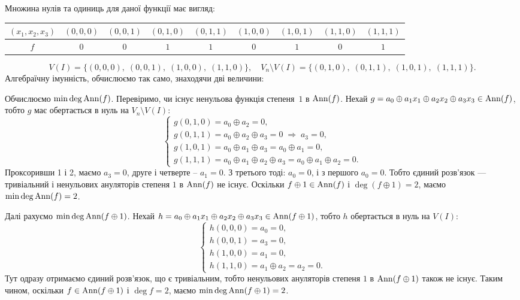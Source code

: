 \noindent Множина нулів та одиниць для даної функції має вигляд:
\begin{center}
    \begin{tabular}{c|cccccccc}
        $(x_1, x_2, x_3)$ & $(0,0,0)$ & $(0,0,1)$ & $(0,1,0)$ & $(0,1,1)$
                          & $(1,0,0)$ & $(1,0,1)$ & $(1,1,0)$ & $(1,1,1)$                         \\
        \hline
        $f$               & $0$       & $0$       & $1$       & $1$       & $0$ & $1$ & $0$ & $1$
    \end{tabular}
\end{center}
\begin{equation*}
    V (I) = \{(0,0,0),\; (0,0,1),\; (1,0,0),\; (1,1,0)\}, \quad
    V_{n} \setminus V(I) = \{(0,1,0),\; (0,1,1),\; (1,0,1),\; (1,1,1)\}.
\end{equation*}
Алгебраїчну імунність, обчислюємо так само, знаходячи дві величини:

Обчислюємо $\min \deg \operatorname{Ann}(f)$. Перевіримо, чи існує ненульова функція степеня~$1$ в $\operatorname{Ann}(f)$. Нехай 
$g = a_0 \oplus a_1 x_1 \oplus a_2 x_2 \oplus a_3 x_3 \in \operatorname{Ann}(f)$, тобто $g$ має обертається в нуль на $V_{n} \setminus V(I)$:
\begin{equation*}
    \begin{cases}
        g(0,1,0) = a_0 \oplus a_2 = 0,                                    \\
        g(0,1,1) = a_0 \oplus a_2 \oplus a_3 = 0 \;\Rightarrow\; a_3 = 0, \\
        g(1,0,1) = a_0 \oplus a_1 \oplus a_3 = a_0 \oplus a_1 = 0,        \\
        g(1,1,1) = a_0 \oplus a_1 \oplus a_2 \oplus a_3 = a_0 \oplus a_1 \oplus a_2 = 0.
    \end{cases}
\end{equation*}
Проксоривши 1 і 2, маємо $a_3 = 0$, друге і четверте -- $a_1 = 0$. З третього тоді: $a_0 = 0$, і з першого 
$a_0 = 0$. Тобто єдиний розв'язок --- тривіальний і ненульових ануляторів степеня $1$ в $\operatorname{Ann}(f)$ не існує. 
Оскільки $f \oplus 1 \in \operatorname{Ann}(f)$ і $\deg(f \oplus 1) = 2$, маємо $\min \deg \operatorname{Ann}(f) = 2$.

Далі рахуємо $\min \deg \operatorname{Ann}(f \oplus 1)$. Нехай $h = a_0 \oplus a_1 x_1 \oplus a_2 x_2 \oplus a_3 x_3 \in \operatorname{Ann}(f \oplus 1)$, 
тобто $h$ обертається в нуль на $V(I)$:
\begin{equation*}
    \begin{cases}
            h(0,0,0) = a_0 = 0, \\
            h(0,0,1) = a_3 = 0, \\
            h(1,0,0) = a_1 = 0, \\
            h(1,1,0) = a_1 \oplus a_2 = a_2 = 0.
    \end{cases}
\end{equation*}
Тут одразу отримаємо єдиний розв'язок, що є тривіальним, тобто ненульових ануляторів степеня $1$ в $\operatorname{Ann}(f \oplus 1)$ 
також не існує. Таким чином, оскільки $f \in \operatorname{Ann}(f \oplus 1)$ і $\deg f = 2$, маємо $\min \deg \operatorname{Ann}(f \oplus 1) = 2$.

